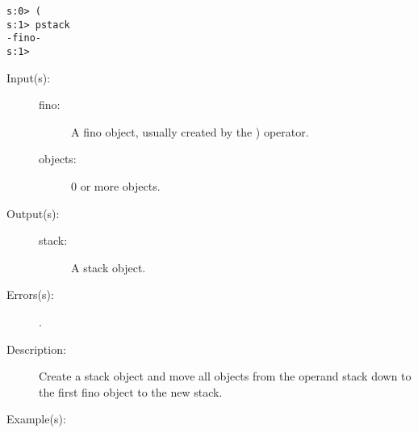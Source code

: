 \begin{description}
\begin{description}
\begin{verbatim}
s:0> (
s:1> pstack
-fino-
s:1>
		\end{verbatim}
	\end{description}
\label{systemdict:sym_rp}
\index{\stilop{}{)}{}}
\item[{\stilop{fino objects}{)}{stack}}: ]
	\begin{description}\item[]
	\item[Input(s): ]
		\begin{description}\item[]
		\item[fino: ]
			A fino object, usually created by the ) operator.
		\item[objects: ]
			0 or more objects.
		\end{description}
	\item[Output(s): ]
		\begin{description}\item[]
		\item[stack: ]
			A stack object.
		\end{description}
	\item[Errors(s): ]
		\begin{description}\item[]
		\item[.]
		\end{description}
	\item[Description: ]
		Create a stack object and move all objects from the operand
		stack down to the first fino object to the new stack.
	\item[Example(s): ]\begin{verbatim}


\end{verbatim}
\end{description}
\end{description}

